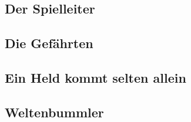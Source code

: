 \subsection{Der Spielleiter}\label{subsec:gamemaster}
\item


\subsection{Die Gefährten}\label{subsec:npcs}


\subsection{Ein Held kommt selten allein}\label{subsec:connecting_friends}


\subsection{Weltenbummler}\label{subsec:its_a_whole_new_world}
